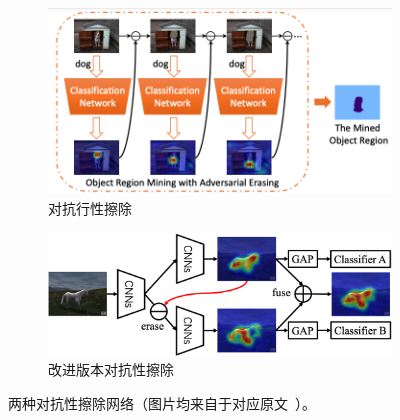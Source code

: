 \begin{figure}[h!]
	\centering
	\begin{subfigure}{0.38\textwidth}
		\centering
		\includegraphics[width=1.0\textwidth]{figure/adversarial_erasing}
        \caption{对抗行性擦除~\cite{WeiFLCZY17}}
		\label{subfig:adversarial_erasing}
	\end{subfigure}
	\begin{subfigure}{0.57\textwidth}
		\centering
		\includegraphics[width=1.0\textwidth]{figure/improved_adversarial_learning}
		\caption{改进版本对抗性擦除~\cite{ZhangWF0H18}}
		\label{subfig:improved_adversarial_learning}
	\end{subfigure}
	\caption[两种对抗性擦除网络]{两种对抗性擦除网络（图片均来自于对应原文~\cite{WeiFLCZY17,ZhangWF0H18}）。}
	\label{mul_fig:weakly_supervised_localization}
\end{figure}

